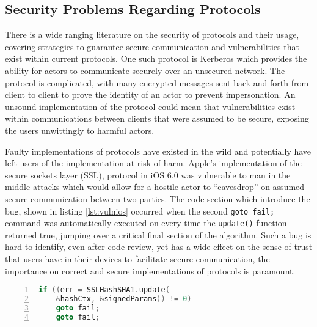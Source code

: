 \documentclass{article}
\begin{document}
	\subsection{Security Problems Regarding Protocols}
	There is a wide ranging literature on the security of protocols and their usage, covering strategies to guarantee secure communication and vulnerabilities that exist within current protocols. One such protocol is Kerberos\cite{neuman1994kerberos} which provides the ability for actors to communicate securely over an unsecured network. The protocol is complicated, with many encrypted messages sent back and forth from client to client to prove the identity of an actor to prevent impersonation. An unsound implementation of the protocol could mean that vulnerabilities exist within communications between clients that were assumed to be secure, exposing the users unwittingly to harmful actors.
	
	Faulty implementations of protocols have existed in the wild and potentially have left users of the implementation at risk of harm. Apple's implementation of the secure sockets layer\cite{elgamal1997secure} (SSL), protocol in iOS 6.0 was vulnerable to man in the middle attacks\cite{bland2014finding} which would allow for a hostile actor to ``eavesdrop'' on assumed secure communication between two parties. The code section which introduce the bug, shown in listing \ref{lst:vulnios} occurred when the second \texttt{goto fail;} command was automatically executed on every time the \texttt{update()} function returned true, jumping over a critical final section of the algorithm. Such a bug is hard to identify, even after code review, yet has a wide effect on the sense of trust that users have in their devices to facilitate secure communication, the importance on correct and secure implementations of protocols is paramount.
	\begin{lstlisting}[label={lst:vulnios}, language=c, frame=single, numbers=left, caption=The vulenarble code section in iOS 6.0's SSL implementation\cite{bland2014finding}]
if ((err = SSLHashSHA1.update(
	&hashCtx, &signedParams)) != 0)
	goto fail;
	goto fail;
	\end{lstlisting}
	\pagebreak
\end{document}
